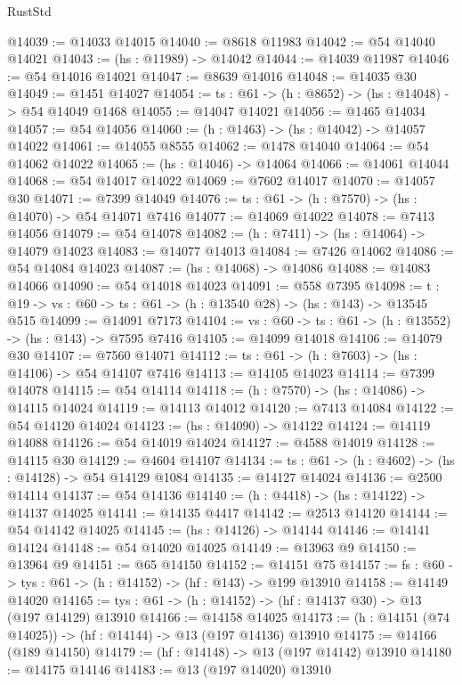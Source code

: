 \begin{lexlean}{RustStd}
\begin{coremodule}
@14039 := @14033 @14015
@14040 := @8618 @11983
@14042 := @54 @14040 @14021
@14043 := (hs : @11989) -> @14042
@14044 := @14039 @11987
@14046 := @54 @14016 @14021
@14047 := @8639 @14016
@14048 := @14035 @30
@14049 := @1451 @14027
@14054 := {ts : @61} -> (h : @8652) -> (hs : @14048) -> @54 @14049 @1468
@14055 := @14047 @14021
@14056 := @1465 @14034
@14057 := @54 @14056
@14060 := (h : @1463) -> (hs : @14042) -> @14057 @14022
@14061 := @14055 @8555
@14062 := @1478 @14040
@14064 := @54 @14062 @14022
@14065 := (hs : @14046) -> @14064
@14066 := @14061 @14044
@14068 := @54 @14017 @14022
@14069 := @7602 @14017
@14070 := @14057 @30
@14071 := @7399 @14049
@14076 := {ts : @61} -> (h : @7570) -> (hs : @14070) -> @54 @14071 @7416
@14077 := @14069 @14022
@14078 := @7413 @14056
@14079 := @54 @14078
@14082 := (h : @7411) -> (hs : @14064) -> @14079 @14023
@14083 := @14077 @14013
@14084 := @7426 @14062
@14086 := @54 @14084 @14023
@14087 := (hs : @14068) -> @14086
@14088 := @14083 @14066
@14090 := @54 @14018 @14023
@14091 := @558 @7395
@14098 := {t : @19} -> {vs : @60} -> {ts : @61} -> (h : @13540 @28) -> (hs : @143) -> @13545 @515
@14099 := @14091 @7173
@14104 := {vs : @60} -> {ts : @61} -> (h : @13552) -> (hs : @143) -> @7595 @7416
@14105 := @14099 @14018
@14106 := @14079 @30
@14107 := @7560 @14071
@14112 := {ts : @61} -> (h : @7603) -> (hs : @14106) -> @54 @14107 @7416
@14113 := @14105 @14023
@14114 := @7399 @14078
@14115 := @54 @14114
@14118 := (h : @7570) -> (hs : @14086) -> @14115 @14024
@14119 := @14113 @14012
@14120 := @7413 @14084
@14122 := @54 @14120 @14024
@14123 := (hs : @14090) -> @14122
@14124 := @14119 @14088
@14126 := @54 @14019 @14024
@14127 := @4588 @14019
@14128 := @14115 @30
@14129 := @4604 @14107
@14134 := {ts : @61} -> (h : @4602) -> (hs : @14128) -> @54 @14129 @1084
@14135 := @14127 @14024
@14136 := @2500 @14114
@14137 := @54 @14136
@14140 := (h : @4418) -> (hs : @14122) -> @14137 @14025
@14141 := @14135 @4417
@14142 := @2513 @14120
@14144 := @54 @14142 @14025
@14145 := (hs : @14126) -> @14144
@14146 := @14141 @14124
@14148 := @54 @14020 @14025
@14149 := @13963 @9
@14150 := @13964 @9
@14151 := @65 @14150
@14152 := @14151 @75
@14157 := {fs : @60} -> {tys : @61} -> (h : @14152) -> (hf : @143) -> @199 @13910
@14158 := @14149 @14020
@14165 := {tys : @61} -> (h : @14152) -> (hf : @14137 @30) -> @13 (@197 @14129) @13910
@14166 := @14158 @14025
@14173 := (h : @14151 (@74 @14025)) -> (hf : @14144) -> @13 (@197 @14136) @13910
@14175 := @14166 (@189 @14150)
@14179 := (hf : @14148) -> @13 (@197 @14142) @13910
@14180 := @14175 @14146
@14183 := @13 (@197 @14020) @13910

\end{coremodule}
\end{lexlean}
